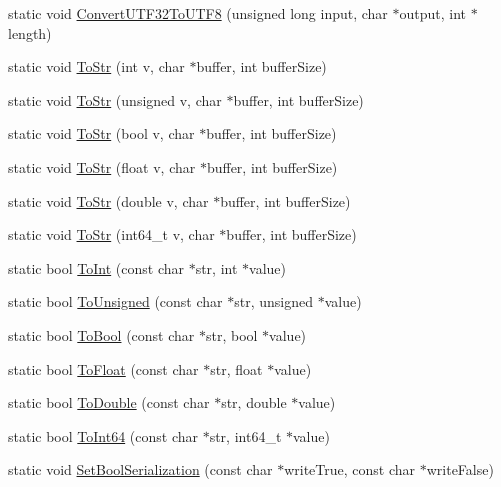 \begin{DoxyCompactItemize}
static void \mbox{\hyperlink{classtinyxml2_1_1_x_m_l_util_a31c00d5c5dfb38382de1dfcaf4be3595}{Convert\+U\+T\+F32\+To\+U\+T\+F8}} (unsigned long input, char $\ast$output, int $\ast$length)
\item 
static void \mbox{\hyperlink{classtinyxml2_1_1_x_m_l_util_a3cd6c703d49b9d51bdf0f4ff6aa021c7}{To\+Str}} (int v, char $\ast$buffer, int buffer\+Size)
\item 
static void \mbox{\hyperlink{classtinyxml2_1_1_x_m_l_util_ac00c2e52c1c36dab3ff41d86a9bf60f9}{To\+Str}} (unsigned v, char $\ast$buffer, int buffer\+Size)
\item 
static void \mbox{\hyperlink{classtinyxml2_1_1_x_m_l_util_adba0718527ae9e80f663a71ea325cb11}{To\+Str}} (bool v, char $\ast$buffer, int buffer\+Size)
\item 
static void \mbox{\hyperlink{classtinyxml2_1_1_x_m_l_util_a8957ad44fee5fa02ba52d73aad4d0a31}{To\+Str}} (float v, char $\ast$buffer, int buffer\+Size)
\item 
static void \mbox{\hyperlink{classtinyxml2_1_1_x_m_l_util_a1cd141e50980fcddd6bf9af5de4b1db7}{To\+Str}} (double v, char $\ast$buffer, int buffer\+Size)
\item 
static void \mbox{\hyperlink{classtinyxml2_1_1_x_m_l_util_a26a8cb5b833ad587b3af39469c8111de}{To\+Str}} (int64\+\_\+t v, char $\ast$buffer, int buffer\+Size)
\item 
static bool \mbox{\hyperlink{classtinyxml2_1_1_x_m_l_util_ad4df4023d11ee3fca9689c49b9707323}{To\+Int}} (const char $\ast$str, int $\ast$value)
\item 
static bool \mbox{\hyperlink{classtinyxml2_1_1_x_m_l_util_a210c8637d5eb4ce3d4625294af0efc2f}{To\+Unsigned}} (const char $\ast$str, unsigned $\ast$value)
\item 
static bool \mbox{\hyperlink{classtinyxml2_1_1_x_m_l_util_ae5b03e0a1ca5d42052a7ac540f7aa12a}{To\+Bool}} (const char $\ast$str, bool $\ast$value)
\item 
static bool \mbox{\hyperlink{classtinyxml2_1_1_x_m_l_util_a399e71edb5f29d61ea81d91ee0332bb9}{To\+Float}} (const char $\ast$str, float $\ast$value)
\item 
static bool \mbox{\hyperlink{classtinyxml2_1_1_x_m_l_util_ad8f75ac140fb19c1c6e164a957c4cd53}{To\+Double}} (const char $\ast$str, double $\ast$value)
\item 
static bool \mbox{\hyperlink{classtinyxml2_1_1_x_m_l_util_afe2ea09257431cd2b4b6d440552e4195}{To\+Int64}} (const char $\ast$str, int64\+\_\+t $\ast$value)
\item 
static void \mbox{\hyperlink{classtinyxml2_1_1_x_m_l_util_af98a6a80dbeec4679366c1aba4c5b747}{Set\+Bool\+Serialization}} (const char $\ast$write\+True, const char $\ast$write\+False)
\end{DoxyCompactItemize}


